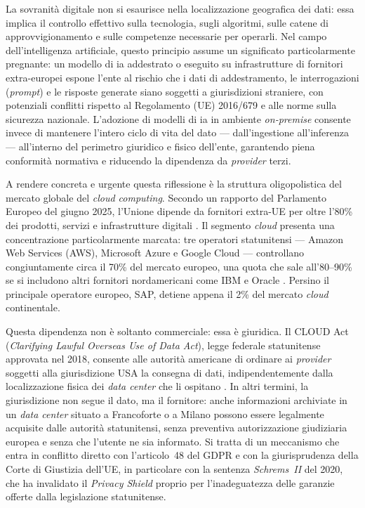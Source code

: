La sovranità digitale non si esaurisce nella localizzazione geografica dei dati: essa implica il controllo effettivo sulla tecnologia, sugli algoritmi, sulle catene di approvvigionamento e sulle competenze necessarie per operarli. Nel campo dell'intelligenza artificiale, questo principio assume un significato particolarmente pregnante: un modello di \gls{ia} addestrato o eseguito su infrastrutture di fornitori extra-europei espone l'ente al rischio che i dati di addestramento, le interrogazioni (\textit{prompt}) e le risposte generate siano soggetti a giurisdizioni straniere, con potenziali conflitti rispetto al Regolamento (UE) 2016/679 \parencite{GDPR} e alle norme sulla sicurezza nazionale. L'adozione di modelli di \gls{ia} in ambiente \textit{on-premise} consente invece di mantenere l'intero ciclo di vita del dato --- dall'ingestione all'inferenza --- all'interno del perimetro giuridico e fisico dell'ente, garantendo piena conformità normativa e riducendo la dipendenza da \textit{provider} terzi.

A rendere concreta e urgente questa riflessione è la struttura oligopolistica del mercato globale del \textit{cloud computing}. Secondo un rapporto del Parlamento Europeo del giugno 2025, l'Unione dipende da fornitori extra-UE per oltre l'80\% dei prodotti, servizi e infrastrutture digitali \parencite{EUParl_TechSovereignty2025}. Il segmento \textit{cloud} presenta una concentrazione particolarmente marcata: tre operatori statunitensi --- Amazon Web Services (AWS), Microsoft Azure e Google Cloud --- controllano congiuntamente circa il 70\% del mercato europeo, una quota che sale all'80--90\% se si includono altri fornitori nordamericani come IBM e Oracle \parencite{Gartner_SovereignCloud2026}. Persino il principale operatore europeo, SAP, detiene appena il 2\% del mercato \textit{cloud} continentale.

Questa dipendenza non è soltanto commerciale: essa è giuridica. Il CLOUD Act (\textit{Clarifying Lawful Overseas Use of Data Act}), legge federale statunitense approvata nel 2018, consente alle autorità americane di ordinare ai \textit{provider} soggetti alla giurisdizione USA la consegna di dati, indipendentemente dalla localizzazione fisica dei \textit{data center} che li ospitano \parencite{CLOUDAct_Wire2025}. In altri termini, la giurisdizione non segue il dato, ma il fornitore: anche informazioni archiviate in un \textit{data center} situato a Francoforte o a Milano possono essere legalmente acquisite dalle autorità statunitensi, senza preventiva autorizzazione giudiziaria europea e senza che l'utente ne sia informato. Si tratta di un meccanismo che entra in conflitto diretto con l'articolo~48 del GDPR e con la giurisprudenza della Corte di Giustizia dell'UE, in particolare con la sentenza \textit{Schrems~II} del 2020, che ha invalidato il \textit{Privacy Shield} proprio per l'inadeguatezza delle garanzie offerte dalla legislazione statunitense.


